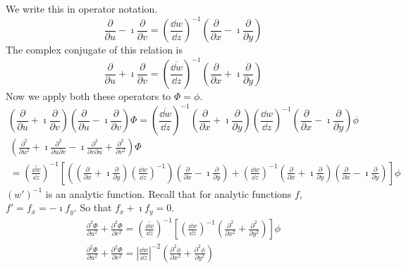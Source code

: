 {\begin{Solution}
  We write this in operator notation.
  \[
  \frac{\partial}{\partial u} - \imath  \frac{\partial}{\partial v} = 
  \left( \frac{\dd w}{\dd z} \right)^{-1} 
  \left( \frac{\partial}{\partial x} - \imath  \frac{\partial}{\partial y} \right)
  \]
  The complex conjugate of this relation is
  \[
  \frac{\partial}{\partial u} + \imath  \frac{\partial}{\partial v} = 
  \left( \overline{ \frac{\dd w}{\dd z} } \right)^{-1} 
  \left( \frac{\partial}{\partial x} + \imath  \frac{\partial}{\partial y} \right)
  \]
  Now we apply both these operators to $\Phi = \phi$.
  \[
  \left( \frac{\partial}{\partial u} + \imath  \frac{\partial}{\partial v} \right) 
  \left( \frac{\partial}{\partial u} - \imath  \frac{\partial}{\partial v} \right) \Phi
  =
  \left( \overline{ \frac{\dd w}{\dd z} } \right)^{-1} 
  \left( \frac{\partial}{\partial x} + \imath  \frac{\partial}{\partial y} \right)
  \left( \frac{\dd w}{\dd z} \right)^{-1} 
  \left( \frac{\partial}{\partial x} - \imath  \frac{\partial}{\partial y} \right) \phi 
  \]
  \begin{multline*}
    \left( \frac{\partial^2}{\partial u^2} + \imath  \frac{\partial^2}{\partial u \partial v} 
      - \imath  \frac{\partial^2}{\partial v \partial u} + \frac{\partial^2}{\partial v^2} \right) \Phi 
    \\
    =
    \left( \overline{ \frac{\dd w}{\dd z} } \right)^{-1} 
    \left[
      \left(
        \left( \frac{\partial}{\partial x} + \imath  \frac{\partial}{\partial y} \right)
        \left( \frac{\dd w}{\dd z} \right)^{-1} 
      \right) 
      \left( \frac{\partial}{\partial x} - \imath  \frac{\partial}{\partial y} \right)
      + 
      \left( \frac{\dd w}{\dd z} \right)^{-1} 
      \left( \frac{\partial}{\partial x} + \imath  \frac{\partial}{\partial y} \right)
      \left( \frac{\partial}{\partial x} - \imath  \frac{\partial}{\partial y} \right)
    \right]
    \phi 
  \end{multline*}
  $\left( w' \right)^{-1}$ is an analytic function.  Recall that for analytic 
  functions $f$, $f' = f_x = -\imath f_y$.  So that $f_x + \imath f_y = 0$.
  \begin{gather*}
    \frac{\partial^2 \Phi}{\partial u^2} + \frac{\partial^2 \Phi}{\partial v^2}
    =
    \left( \overline{ \frac{\dd w}{\dd z} } \right)^{-1} 
    \left[
      \left( \frac{\dd w}{\dd z} \right)^{-1} 
      \left( \frac{\partial^2}{\partial x^2} + \frac{\partial^2}{\partial y^2} \right)
    \right]
    \phi 
    \\
    \frac{\partial^2 \Phi}{\partial u^2} + \frac{\partial^2 \Phi}{\partial v^2}
    = \left| \frac{\dd w}{\dd z} \right|^{-2} 
    \left( \frac{\partial^2 \phi}{\partial x^2} + \frac{\partial^2 \phi}{\partial y^2} \right)
  \end{gather*}
\end{Solution}












}
